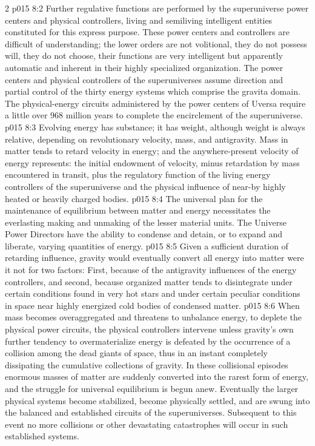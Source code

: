 \begin{multicols}{2}
\vs p015 8:2 Further regulative functions are performed by the superuniverse power centers and physical controllers, living and semiliving intelligent entities constituted for this express purpose. These power centers and controllers are difficult of understanding; the lower orders are not volitional, they do not possess will, they do not choose, their functions are very intelligent but apparently automatic and inherent in their highly specialized organization. The power centers and physical controllers of the superuniverses assume direction and partial control of the thirty energy systems which comprise the gravita domain. The physical\hyp{}energy circuits administered by the power centers of Uversa require a little over 968 million years to complete the encirclement of the superuniverse.\plusone
\pc \vs p015 8:3 Evolving energy has substance; it has weight, although weight is always relative, depending on revolutionary velocity, mass, and antigravity. Mass in matter tends to retard velocity in energy; and the anywhere\hyp{}present velocity of energy represents: the initial endowment of velocity, minus retardation by mass encountered in transit, plus the regulatory function of the living energy controllers of the superuniverse and the physical influence of near\hyp{}by highly heated or heavily charged bodies.
\vs p015 8:4 The universal plan for the maintenance of equilibrium between matter and energy necessitates the everlasting making and unmaking of the lesser material units. The Universe Power Directors have the ability to condense and detain, or to expand and liberate, varying quantities of energy.
\vs p015 8:5 Given a sufficient duration of retarding influence, gravity would eventually convert all energy into matter were it not for two factors: First, because of the antigravity influences of the energy controllers, and second, because organized matter tends to disintegrate under certain conditions found in very hot stars and under certain peculiar conditions in space near highly energized cold bodies of condensed matter.
\vs p015 8:6 When mass becomes overaggregated and threatens to unbalance energy, to deplete the physical power circuits, the physical controllers intervene unless gravity’s own further tendency to overmaterialize energy is defeated by the occurrence of a collision among the dead giants of space, thus in an instant completely dissipating the cumulative collections of gravity. In these collisional episodes enormous masses of matter are suddenly converted into the rarest form of energy, and the struggle for universal equilibrium is begun anew. Eventually the larger physical systems become stabilized, become physically settled, and are swung into the balanced and established circuits of the superuniverses. Subsequent to this event no more collisions or other devastating catastrophes will occur in such established systems.

\end{multicols}
